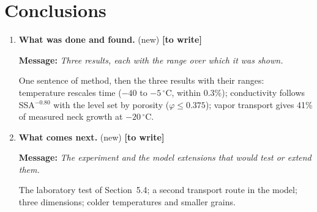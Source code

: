 \documentclass[11pt]{article}
\newcommand{\Miss}{\textcolor{miss}{\textbf{[to write]}}\ }
\newcommand{\Msg}[1]{\par\textcolor{open}{\textbf{Message:}} \textit{#1}\par}
\newcommand{\New}[1]{\textbf{#1} \textnormal{\small(new)}}
\begin{document}
\section{Conclusions}
\begin{enumerate}
\item \New{What was done and found.} \Miss
  \Msg{Three results, each with the range over which it was shown.}
  One sentence of method, then the
  three results with their ranges: temperature rescales time ($-40$ to
  $-5\,^{\circ}$C, within 0.3\%); conductivity follows SSA$^{-0.80}$ with the
  level set by porosity ($\varphi \le 0.375$); vapor transport gives 41\% of
  measured neck growth at $-20\,^{\circ}$C.
\item \New{What comes next.} \Miss
  \Msg{The experiment and the model extensions that would test or extend them.}
  The laboratory test of Section~5.4; a
  second transport route in the model; three dimensions; colder
  temperatures and smaller grains.
\end{enumerate}
\end{document}
